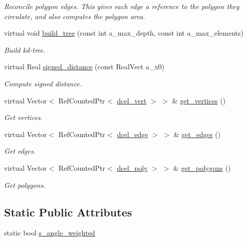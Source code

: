 \begin{DoxyCompactItemize}
\begin{DoxyCompactList}\small\item\em Reconcile polygon edges. This gives each edge a reference to the polygon they circulate, and also computes the polygon area. \end{DoxyCompactList}\item 
virtual void \hyperlink{classdcel__mesh_a74e4ba6363d1d1c033358170e39ab002}{build\+\_\+tree} (const int a\+\_\+max\+\_\+depth, const int a\+\_\+max\+\_\+elements)
\begin{DoxyCompactList}\small\item\em Build kd-\/tree. \end{DoxyCompactList}\item 
virtual Real \hyperlink{classdcel__mesh_a3d865e51f9a886c0d4bbed6396856f60}{signed\+\_\+distance} (const Real\+Vect a\+\_\+x0)
\begin{DoxyCompactList}\small\item\em Compute signed distance. \end{DoxyCompactList}\item 
virtual Vector$<$ Ref\+Counted\+Ptr$<$ \hyperlink{classdcel__vert}{dcel\+\_\+vert} $>$ $>$ \& \hyperlink{classdcel__mesh_ac8a4d7a0e9acb539f3b982b3a21b74a6}{get\+\_\+vertices} ()
\begin{DoxyCompactList}\small\item\em Get vertices. \end{DoxyCompactList}\item 
virtual Vector$<$ Ref\+Counted\+Ptr$<$ \hyperlink{classdcel__edge}{dcel\+\_\+edge} $>$ $>$ \& \hyperlink{classdcel__mesh_a2de22a0b9fd86e3c6b6e0a12b319833e}{get\+\_\+edges} ()
\begin{DoxyCompactList}\small\item\em Get edges. \end{DoxyCompactList}\item 
virtual Vector$<$ Ref\+Counted\+Ptr$<$ \hyperlink{classdcel__poly}{dcel\+\_\+poly} $>$ $>$ \& \hyperlink{classdcel__mesh_a07443f899d4fdf48348b5a23c34eed97}{get\+\_\+polygons} ()
\begin{DoxyCompactList}\small\item\em Get polygons. \end{DoxyCompactList}\end{DoxyCompactItemize}
\subsection*{Static Public Attributes}
\begin{DoxyCompactItemize}
\item 
static bool \hyperlink{classdcel__mesh_ade307a53055e25e8f22f12396335dd76}{s\+\_\+angle\+\_\+weighted}
\end{DoxyCompactItemize}
